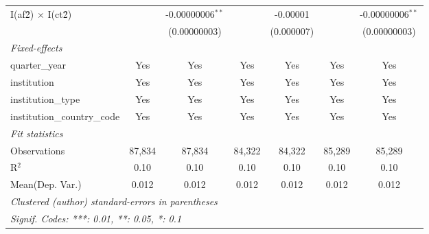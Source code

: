 \begin{tabular}{lcccccc}
   I(af\^2) $\times$ I(ct\^2)         &                & -0.00000006$^{**}$ &                & -0.00001       &                & -0.00000006$^{**}$\\   
                                      &                & (0.00000003)       &                & (0.000007)     &                & (0.00000003)\\   
   \midrule
   \emph{Fixed-effects}\\
   quarter\_year                      & Yes            & Yes                & Yes            & Yes            & Yes            & Yes\\  
   institution                        & Yes            & Yes                & Yes            & Yes            & Yes            & Yes\\  
   institution\_type                  & Yes            & Yes                & Yes            & Yes            & Yes            & Yes\\  
   institution\_country\_code         & Yes            & Yes                & Yes            & Yes            & Yes            & Yes\\  
   \midrule
   \emph{Fit statistics}\\
   Observations                       & 87,834         & 87,834             & 84,322         & 84,322         & 85,289         & 85,289\\  
   R$^2$                              & 0.10           & 0.10               & 0.10           & 0.10           & 0.10           & 0.10\\  
Mean(Dep. Var.) & 0.012 & 0.012 & 0.012 & 0.012 & 0.012 & 0.012 \\
   \midrule \midrule
   \multicolumn{7}{l}{\emph{Clustered (author) standard-errors in parentheses}}\\
   \multicolumn{7}{l}{\emph{Signif. Codes: ***: 0.01, **: 0.05, *: 0.1}}\\
\end{tabular}
\par\endgroup
